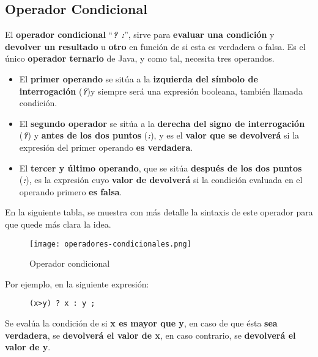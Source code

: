 \subsection{Operador Condicional}
El \textbf{operador condicional} ``\textbf{\textit{? :}}'', sirve para \textbf{evaluar una condición} y \textbf{devolver un resultado} u \textbf{otro} en función de si esta es verdadera o falsa. Es el único \textbf{operador ternario} de Java, y como tal, necesita tres operandos.

\begin{itemize}
    \item El \textbf{primer operando} se sitúa a la \textbf{izquierda del símbolo de interrogación} (\textbf{\textit{?}})y siempre será una expresión booleana, también llamada condición.
    \item El \textbf{segundo operador} se sitúa a la \textbf{derecha del signo de interrogación} (\textbf{\textit{?}}) y \textbf{antes de los dos puntos} (\textbf{\textit{:}}), y es el \textbf{valor que se devolverá} si la expresión del primer operando \textbf{es verdadera}.
    \item El \textbf{tercer y último operando}, que se sitúa \textbf{después de los dos puntos} (\textbf{\textit{:}}), es la expresión cuyo \textbf{valor de devolverá} si la condición evaluada en el operando primero \textbf{es falsa}.
\end{itemize}

En la siguiente tabla, se muestra con más detalle la sintaxis de este operador para que quede más clara la idea.

\begin{figure}[H]
    \centering
    \texttt{[image: operadores-condicionales.png]}
    \caption{Operador condicional}
\end{figure}

Por ejemplo, en la siguiente expresión:

\begin{figure}[H]
    \begin{tcolorbox}[sharp corners, colback=yellow!30, colframe=white!20]
        \scriptsize
\begin{verbatim}
(x>y) ? x : y ;
\end{verbatim}
    \end{tcolorbox}
\end{figure}

Se evalúa la condición de si \textbf{x es mayor que y}, en caso de que ésta \textbf{sea verdadera}, se \textbf{devolverá el valor de x}, en caso contrario, se \textbf{devolverá el valor de y}.

